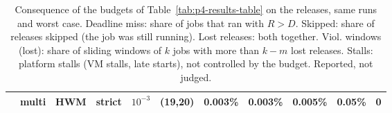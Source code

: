 \begin{table}[ht]
{\begin{tabular}{llllrrrrrrr}
 & multi & HWM & strict & $10^{-3}$ & (19,20) & 0.003\% & 0.003\% & 0.005\% & 0.05\% & 0 \\
\bottomrule
\end{tabular}}
\caption{Consequence of the budgets of Table~\ref{tab:p4-results-table} on the releases, same runs and worst case. Deadline miss: share of jobs that ran with $R>D$. Skipped: share of releases skipped (the job was still running). Lost releases: both together. Viol. windows (lost): share of sliding windows of $k$ jobs with more than $k-m$ lost releases. Stalls: platform stalls (VM stalls, late starts), not controlled by the budget. Reported, not judged.}
\label{tab:p4-results-table-lost}
\end{table}
